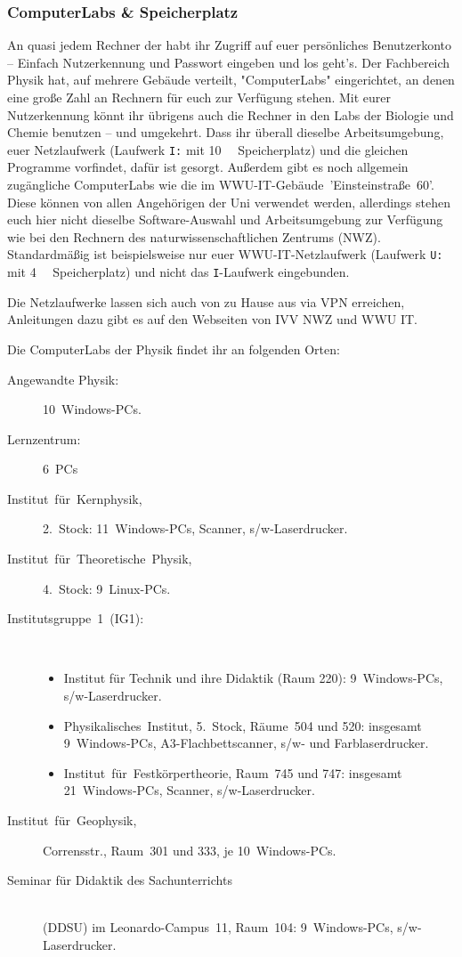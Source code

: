 \begin{multicols}{2}
\subsubsection{ComputerLabs \& Speicherplatz}
An quasi jedem Rechner der \UniMuenster{} habt ihr Zugriff auf euer persönliches Benutzerkonto -- Einfach Nutzerkennung und Passwort eingeben und los geht's.
Der Fachbereich Physik hat, auf mehrere Gebäude verteilt, "ComputerLabs" eingerichtet, an denen eine große Zahl an Rechnern für euch zur Verfügung stehen.
Mit eurer Nutzerkennung könnt ihr übrigens auch die Rechner in den Labs der Biologie und Chemie benutzen -- und umgekehrt.
Dass ihr überall dieselbe Arbeitsumgebung, euer Netzlaufwerk (Laufwerk \texttt{I:} mit \SI{10}{\giga\byte} Speicherplatz) und die gleichen Programme vorfindet, dafür ist gesorgt.
Außerdem gibt es noch allgemein zugängliche ComputerLabs wie die im WWU-IT-Gebäude~'Einsteinstraße~60'.
Diese können von allen Angehörigen der Uni verwendet werden, allerdings stehen euch hier nicht dieselbe Software-Auswahl und Arbeitsumgebung zur Verfügung wie bei den Rechnern des naturwissenschaftlichen Zentrums (NWZ).
Standardmäßig ist beispielsweise nur euer WWU-IT-Netzlaufwerk (Laufwerk \texttt{U:} mit \SI{4}{\giga\byte} Speicherplatz) und nicht das \texttt{I}-Laufwerk eingebunden.

Die Netzlaufwerke lassen sich auch von zu Hause aus via VPN erreichen, Anleitungen dazu gibt es auf den Webseiten von IVV NWZ und WWU IT.

Die ComputerLabs der Physik findet ihr an folgenden Orten:
\begin{description}
	\item[Angewandte Physik:] 10~Windows-PCs.
	\item[Lernzentrum:] 6~PCs
	\item[Institut~für~Kernphysik,] 2.~Stock: 11~Windows-PCs, Scanner, s/w-Laserdrucker.
	\item[Institut~für~Theoretische~Physik,] 4.~Stock: 9~Linux-PCs.
	\item[Institutsgruppe~1~(IG1):]~
		\begin{itemize}[leftmargin=1mm]
			\item Institut für Technik und ihre Didaktik (Raum 220): 9~Windows-PCs, s/w-Laserdrucker.
			\item Physikalisches~Institut, 5.~Stock, Räume~504 und 520: insgesamt 9~Windows-PCs, A3-Flachbettscanner, s/w- und Farblaserdrucker.
			\item Institut~für~Festkörpertheorie, Raum~745 und 747: insgesamt 21~Windows-PCs, Scanner, s/w-Laserdrucker.
		\end{itemize}
	\item[Institut~für~Geophysik,] Corrensstr., Raum~301 und 333, je 10~Windows-PCs.
	\item[Seminar für Didaktik des Sachunterrichts]~\\(DDSU) im Leonardo-Campus~11, Raum~104: 9~Windows-PCs, s/w-Laserdrucker.
\end{description}


\end{multicols}
